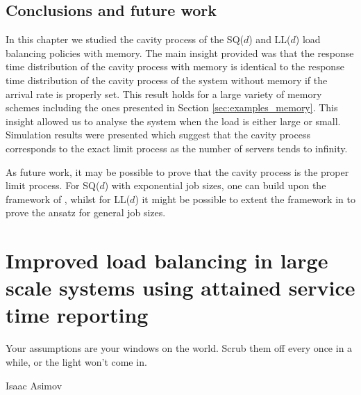 \documentclass[12pt]{report}
\begin{document}
\section{Conclusions and future work} \label{sec:conclusions}
In this chapter we studied the cavity process of the SQ($d$) and LL($d$) load balancing
policies with memory. The main insight provided was that the response time distribution
of the cavity process with memory is identical to the response time distribution 
of the cavity process of the system without memory if the arrival rate is properly set.
This result holds for a large variety of memory schemes including the ones 
presented in Section \ref{sec:examples_memory}. This insight allowed us to analyse the system when the load is either large or small. Simulation results were presented which suggest that the cavity process corresponds to the exact limit process as the number of servers tends to infinity.

As future work, it may be possible to prove that the cavity process is the proper limit process. For SQ($d$) with exponential job sizes, one can build upon the framework of \cite{benaim2008class}, whilst for LL($d$) it might be possible to extent the framework in \cite{shneer2020large} to prove the ansatz for general job sizes.
\chapter{Improved load balancing in large scale systems using attained service time reporting}\label{chap:expected_workload}
\epigraph{Your assumptions are your windows on the world.\newline
	Scrub them off every once in a while, or the light won't come in.}{Isaac Asimov}
\end{document}
